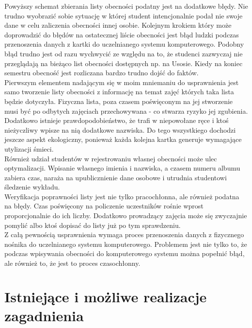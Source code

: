 \documentclass[declaration,shortabstract, mgr]{iithesis}
\begin{document}
\indent Powyższy schemat zbierania listy obecności podatny jest na dodatkowe błędy. Nie trudno wyobrazić sobie sytuację w której student intencjonalnie podał nie swoje dane w celu zaliczenia obecności innej osobie. Kolejnym krokiem który może doprowadzić do błędów na ostatecznej liście obecności jest błąd ludzki podczas przenoszenia danych z kartki do uczelnianego systemu komputerowego. Podobny błąd trudno jest od razu wychwycić ze względu na to, że studenci zazwyczaj nie przeglądają na bieżąco list obecności dostępnych np. na Usosie. Kiedy na koniec semestru obecność jest rozliczana bardzo trudno dojść do faktów.\\
\indent Pierwszym elementem nadającym się w moim mniemaniu do usprawnienia jest samo tworzenie listy obecności z informację na temat zajęć których taka lista będzie dotyczyła. Fizyczna lista, poza czasem poświęconym na jej stworzenie musi być po odbytych zajęciach przechowywana - co stwarza ryzyko jej zgubienia. Dodatkowo istnieje prawdopodobieństwo, że trafi w niepowołane ręce i ktoś nieżyczliwy wpisze na nią dodatkowe nazwiska. Do tego wszystkiego dochodzi jeszcze aspekt ekologiczny, ponieważ każda kolejna kartka generuje wymagające utylizacji śmieci. \\
\indent Również udział studentów w rejestrowaniu własnej obecności może ulec optymalizacji. Wpisanie własnego imienia i nazwiska, a czasem numeru albumu zabiera czas, naraża na upublicznienie dane osobowe i utrudnia studentowi śledzenie wykładu.\\
\indent Weryfikacja poprawności listy jest nie tylko pracochłonna, ale również podatna na błędy. Czas poświęcony na policzenie uczestników rośnie wprost proporcjonalnie do ich liczby. Dodatkowo prowadzący zajęcia może się zwyczajnie pomylić albo ktoś dopisać do listy już po tym sprawdzeniu.\\
\indent Z całą pewnością usprawnienia wymaga proces przenoszenia danych z fizycznego nośnika do uczelnianego systemu komputerowego. Problemem jest nie tylko to, że podczas wpisywania obecności do komputerowego systemu można popełnić błąd, ale również to, że jest to proces czasochłonny.\\

\section{Istniejące i możliwe realizacje zagadnienia}
\end{document}
